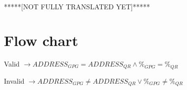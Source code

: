 \documentclass[12pt,a4paper]{article}
\begin{document}
\begin{center}
*****[NOT FULLY TRANSLATED YET]*****
\end{center}

\newpage

\section{Flow chart}

\begin{center}

\end{center}

Valid $ \rightarrow ADDRESS_{GPG} = ADDRESS_{QR} \wedge \%_{GPG} = \%_{QR} $

Invalid $ \rightarrow ADDRESS_{GPG} \neq ADDRESS_{QR} \vee \%_{GPG} \neq \%_{QR} $




\end{document}
